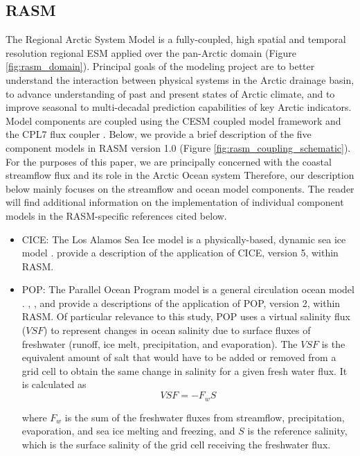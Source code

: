 \documentclass[jgrga, draft]{agutex}
\begin{document}
\begin{article}
\subsection{RASM}
\label{sec:rasm}
The Regional Arctic System Model is a fully-coupled, high spatial and temporal resolution regional ESM applied over the pan-Arctic domain (Figure \ref{fig:rasm_domain}).
Principal goals of the modeling project are to better understand the interaction between physical systems in the Arctic drainage basin, to advance understanding of past and present states of Arctic climate, and to improve seasonal to multi-decadal prediction capabilities of key Arctic indicators.
Model components are coupled using the CESM coupled model framework and the CPL7 flux coupler \citep{Craig_2011}.
Below, we provide a brief description of the five component models in RASM version 1.0 (Figure \ref{fig:rasm_coupling_schematic}).
For the purposes of this paper, we are principally concerned with the coastal streamflow flux and its role in the Arctic Ocean system
Therefore, our description below mainly focuses on the streamflow and ocean model components.
The reader will find additional information on the implementation of individual component models in the RASM-specific references cited below.

\begin{itemize}[leftmargin=+.5in]
\item CICE: The Los Alamos Sea Ice model is a physically-based, dynamic sea ice model \citep{Hunke_2010}.
\citet{Roberts_2015a} provide a description of the application of CICE, version 5, within RASM.
\item POP: The Parallel Ocean Program model is a general circulation ocean model \citep{Smith_2010}.
\citet{Maslowski_2012}, \citet{Roberts_2015a}, and \citet{Osinski_2016} provide a descriptions of the application of POP, version 2, within RASM.
Of particular relevance to this study, POP uses a virtual salinity flux ($VSF$) to represent changes in ocean salinity due to surface fluxes of freshwater (runoff, ice melt, precipitation, and evaporation).
The $VSF$ is the equivalent amount of salt that would have to be added or removed from a grid cell to obtain the same change in salinity for a given fresh water flux.
It is calculated as
\begin{equation}
  \label{eq:SaltFlux}
  VSF=-F_w S
\end{equation}

where $F_w$ is the sum of the freshwater fluxes from streamflow, precipitation, evaporation, and sea ice melting and freezing, and $S$ is the reference salinity, which is the surface salinity of the grid cell receiving the freshwater flux.


\end{itemize}
\end{article}
\end{document}
